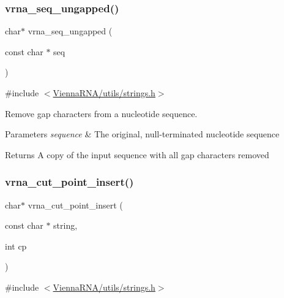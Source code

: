 \subsubsection{\texorpdfstring{vrna\+\_\+seq\+\_\+ungapped()}{vrna\_seq\_ungapped()}}
{\footnotesize\ttfamily char$\ast$ vrna\+\_\+seq\+\_\+ungapped (\begin{DoxyParamCaption}\item[{const char $\ast$}]{seq }\end{DoxyParamCaption})}



{\ttfamily \#include $<$\hyperlink{strings_8h}{Vienna\+R\+N\+A/utils/strings.\+h}$>$}



Remove gap characters from a nucleotide sequence. 


\begin{DoxyParams}{Parameters}
{\em sequence} & The original, null-\/terminated nucleotide sequence \\
\hline
\end{DoxyParams}
\begin{DoxyReturn}{Returns}
A copy of the input sequence with all gap characters removed 
\end{DoxyReturn}
\mbox{\label{group__string__utils_ga74f05ece32ea73b59f84a7452afd5fae}} 
\subsubsection{\texorpdfstring{vrna\+\_\+cut\+\_\+point\+\_\+insert()}{vrna\_cut\_point\_insert()}}
{\footnotesize\ttfamily char$\ast$ vrna\+\_\+cut\+\_\+point\+\_\+insert (\begin{DoxyParamCaption}\item[{const char $\ast$}]{string,  }\item[{int}]{cp }\end{DoxyParamCaption})}



{\ttfamily \#include $<$\hyperlink{strings_8h}{Vienna\+R\+N\+A/utils/strings.\+h}$>$}



